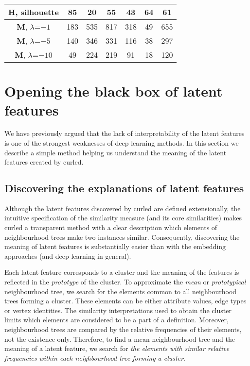 \begin{table}[t]
\begin{center}
{\begin{tabular}[t]{ccccccc}
    \textbf{H}, silhouette  		& 85           & 20  	 & 55  		& 43   		& 64  & 61 \\
	\midrule
	\textbf{M}, $\lambda$=$-1$ 		& 183          & 535     & 817		& 318  		& 49   &  655	   \\
	
	\textbf{M}, $\lambda$=$-5$ 		& 140          & 346   	 & 331		& 116    	& 38   & 297	   \\
	
	\textbf{M}, $\lambda$=$-10$		& 49          & 224 	 & 219		& 91  		& 18   & 120	   \\
	\bottomrule
	
\end{tabular} 
}

\label{tab:Size}

\end{center}
\end{table}



\section{Opening the black box of latent features}

We have previously argued that the lack of interpretability of the latent features is one of the strongest weaknesses of deep learning methods.
In this section we describe a simple method helping us understand the meaning of the latent features created by \gls{curled}.






\subsection{Discovering the explanations of latent features}

Although the latent features discovered by \gls{curled} are defined extensionally, the intuitive specification of the similarity measure (and its core similarities) makes \gls{curled} a transparent method with a clear description which elements of neighbourhood trees make two instances similar.
Consequently, discovering the meaning of latent features is substantially easier than with the embedding approaches (and deep learning in general).

Each latent feature corresponds to a cluster and the meaning of the features is reflected in the \textit{prototype} of the cluster.
To approximate the \textit{mean} or \textit{prototypical} neighbourhood tree, we search for the elements common to all neighbourhood trees forming a cluster.
These elements can be either attribute values, edge types or vertex identities.
The similarity interpretations used to obtain the cluster limits which elements are considered to be a part of a definition.
Moreover, neighbourhood trees are compared by the relative frequencies of their elements, not the existence only.
Therefore, to find a mean neighbourhood tree and the meaning of a latent feature, we search for \textit{the elements with similar relative frequencies within each neighbourhood tree forming a cluster}.




